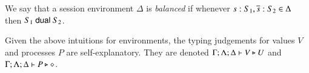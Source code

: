 \documentclass[runningheads]{llncs}
\begin{document}

\begin{definition}[Balanced]\label{d:wtenv}%
	We say that a session environment $\Delta$ is {\em balanced} if whenever
	$s: S_1, \overline{s}: S_2 \in \Delta$ then $S_1 \ \mathsf{dual}\  S_2$.
\end{definition}

Given the above intuitions for environments, 
the typing judgements for values $V$ and processes $P$ are self-explanatory.
They are denoted 
$\Gamma; \Lambda; \Delta \vdash V \triangleright U$ and $\Gamma; \Lambda; \Delta \vdash P \triangleright \diamond$.
%
 


\end{document}
